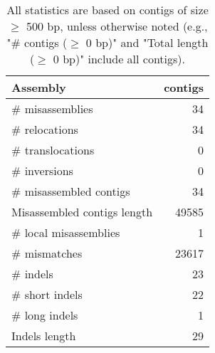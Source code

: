 \documentclass[12pt,a4paper]{article}
\begin{document}
\begin{table}[ht]
\begin{center}
\caption{All statistics are based on contigs of size $\geq$ 500 bp, unless otherwise noted (e.g., "\# contigs ($\geq$ 0 bp)" and "Total length ($\geq$ 0 bp)" include all contigs).}
\begin{tabular}{|l*{1}{|r}|}
\hline
Assembly & contigs \\ \hline
\# misassemblies & 34 \\ \hline
\hspace{5mm}\# relocations & 34 \\ \hline
\hspace{5mm}\# translocations & 0 \\ \hline
\hspace{5mm}\# inversions & 0 \\ \hline
\# misassembled contigs & 34 \\ \hline
Misassembled contigs length & 49585 \\ \hline
\# local misassemblies & 1 \\ \hline
\# mismatches & 23617 \\ \hline
\# indels & 23 \\ \hline
\hspace{5mm}\# short indels & 22 \\ \hline
\hspace{5mm}\# long indels & 1 \\ \hline
Indels length & 29 \\ \hline
\end{tabular}
\end{center}
\end{table}
\end{document}
